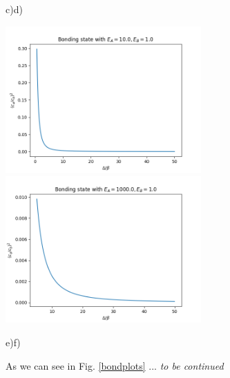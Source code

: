\begin{questions}
\begin{solution}
\hspace{3.6cm}c)\hspace{7.5cm}d)

\includegraphics[width=75mm]{bond-10-mal.png}
\includegraphics[width=75mm]{bond-1000-mal.png}\label{bondplots}

\hspace{3.6cm}e)\hspace{7.5cm}f)


 As we can see in Fig. \ref{bondplots} ... \textit{to be continued}
\end{solution}
\end{questions}
